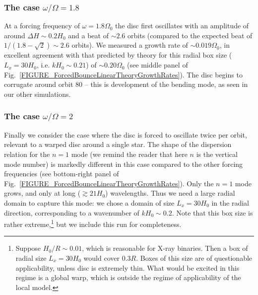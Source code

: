 \documentclass[fleqn,usenatbib]{mnras}
\begin{document}
\subsubsection{The case $\omega/\Omega = 1.8$}
\label{SECTION_ForcedBounceSimulation_Omega1pt80_a0pt1}
At a forcing frequency of $\omega = 1.8 \Omega_0$ the disc first oscillates with an amplitude of around $\Delta H \sim 0.2 H_0$ and a beat of $\sim2.6$ orbits (compared to the expected beat of $1/(1.8-\sqrt{2}) \sim 2.6$ orbits). We measured a growth rate of $\sim 0.019 \Omega_0$, in excellent agreement with that predicted by theory for this radial box size ($L_x = 30H_0$, i.e. $kH_0 \sim 0.21$) of $\sim 0.20 \Omega_0$ (see middle panel of Fig.~\ref{FIGURE_ForcedBounceLinearTheoryGrowthRates}). The disc begins to corrugate around orbit 80 -- this is development of the bending mode, as seen in our other simulations.




\subsubsection{The case $\omega/\Omega = 2$}
\label{SECTION_ForcedBounceSimulation_Omega2pt00_a0pt1}
Finally we consider the case where the disc is forced to oscillate twice per orbit, relevant to a warped disc around a single star. The shape of the dispersion relation for the $n=1$ mode (we remind the reader that here $n$ is the vertical mode number) is markedly different in this case compared to the other forcing frequencies (see bottom-right panel of Fig.~\ref{FIGURE_ForcedBounceLinearTheoryGrowthRates}). Only the $n=1$ mode grows, and only at long ($\gtrsim 21H_0$) wavelengths. Thus we need a large radial domain to capture this mode: we chose a domain of size $L_x = 30H_0$ in the radial direction, corresponding to a wavenumber of $kH_0 \sim 0.2$. Note that this box size is rather extreme,\footnote{ Suppose $H_0/R \sim 0.01$, which is reasonable for X-ray binaries. Then a box of radial size $L_x = 30H_0$ would cover $0.3R$. Boxes of this size are of questionable applicability, unless disc is extremely thin. What would be excited in this regime is a global warp, which is outside the regime of applicability of the local model.} but we include this run for completeness.
\end{document}
